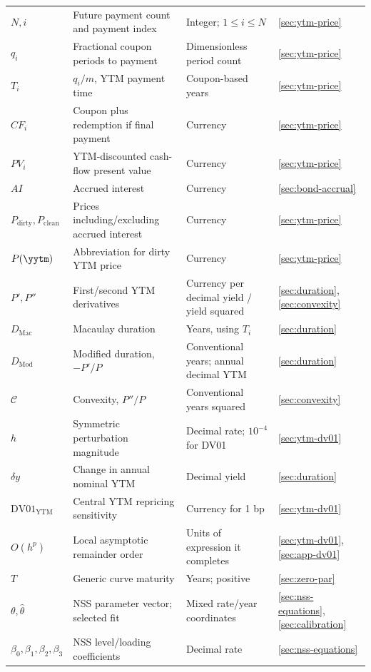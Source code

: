 \begin{longtable}{@{}L{0.18\textwidth}L{0.36\textwidth}L{0.18\textwidth}L{0.19\textwidth}@{}}
\(N,i\) & Future payment count and payment index & Integer; \(1\leq i\leq N\) & \ref{sec:ytm-price}\\
\(q_i\) & Fractional coupon periods to payment & Dimensionless period count & \ref{sec:ytm-price}\\
\(T_i\) & \(q_i/m\), YTM payment time & Coupon-based years & \ref{sec:ytm-price}\\
\(CF_i\) & Coupon plus redemption if final payment & Currency & \ref{sec:ytm-price}\\
\(PV_i\) & YTM-discounted cash-flow present value & Currency & \ref{sec:ytm-price}\\
\(AI\) & Accrued interest & Currency & \ref{sec:bond-accrual}\\
\(P_{\mathrm{dirty}},P_{\mathrm{clean}}\) & Prices including/excluding accrued interest & Currency & \ref{sec:ytm-price}\\
\(P(\yytm)\) & Abbreviation for dirty YTM price & Currency & \ref{sec:ytm-price}\\
\(P',P''\) & First/second YTM derivatives & Currency per decimal yield / yield squared & \ref{sec:duration}, \ref{sec:convexity}\\
\(D_{\mathrm{Mac}}\) & Macaulay duration & Years, using \(T_i\) & \ref{sec:duration}\\
\(D_{\mathrm{Mod}}\) & Modified duration, \(-P'/P\) & Conventional years; annual decimal YTM & \ref{sec:duration}\\
\(\mathcal C\) & Convexity, \(P''/P\) & Conventional years squared & \ref{sec:convexity}\\
\(h\) & Symmetric perturbation magnitude & Decimal rate; \(10^{-4}\) for DV01 & \ref{sec:ytm-dv01}\\
\(\delta y\) & Change in annual nominal YTM & Decimal yield & \ref{sec:duration}\\
\(\mathrm{DV01}_{\mathrm{YTM}}\) & Central YTM repricing sensitivity & Currency for 1 bp & \ref{sec:ytm-dv01}\\
\(O(h^p)\) & Local asymptotic remainder order & Units of expression it completes & \ref{sec:ytm-dv01}, \ref{sec:app-dv01}\\
\(T\) & Generic curve maturity & Years; positive & \ref{sec:zero-par}\\
\(\theta,\widehat\theta\) & NSS parameter vector; selected fit & Mixed rate/year coordinates & \ref{sec:nss-equations}, \ref{sec:calibration}\\
\(\beta_0,\beta_1,\beta_2,\beta_3\) & NSS level/loading coefficients & Decimal rate & \ref{sec:nss-equations}\\

\end{longtable}
